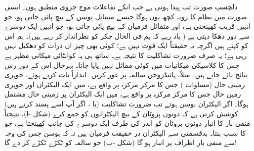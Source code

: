 دلچسپ صورت تب پیدا ہوتی ہے جب انکے تفاعلات موج جزوی منطبق ہوں۔ ایسی صورت میں نظام کا رویہ کچھ یوں ہوگا جیسے متماثل بوسن کے بیچ پائی جاتی ہو، جو انہیں قریب کھینچتی ہے، اور متماثل فرمیان کے بیچ  پائی جاتی ہو، جو انہیں ایک دوسرے سے دور دھکا دیتی ہے ( یاد رہے کہ ہم فی الحال چکر کو نظرانداز کر رہے ہیں)۔ ہم اس کو  کہتے ہیں اگرچہ یہ حقیقتاً ایک قوت نہیں ہے؛ کوئی بھی چیز ان ذرات کو دھکیل نہیں رہی ہے؛ یہ صرف ضرورت تشاکلیت کا  نتیجہ ہے۔ ساتھ ہی یہ کوانٹائی میکانی مظہر ہے جس کا کلاسیکی میکانیات میں کوئی مماثل نہیں پایا جاتا۔ بہرحال اس کے دور رس نتائج پائے جاتے ہیں۔ مثلاً، ہائیڈروجن سالمہ  پر غور کریں۔ اندازاً بات کرتے ہوئے، جوہری زمینی حال (مساوات ) جس کا مرکز مرکزہ  پر واقع ہے، میں ایک الیکٹران اور جوہری زمین حال جس کا مرکز مرکزہ  پر واقع ہے، میں ایک الیکٹران پر زمینی حال مشتمل ہوگا۔ اگر الیکٹران بوسن ہوتے تب ضرورت تشاکلیت (یا ، اگر آپ اسے پسند کرتے ہیں) کوشش کرتی ہے کہ دونوں پروٹان کے بیچ الیکٹرانوں کو جمع کرے
 (شکل -ا)، نتیجتاً منفی بار کا انبار دونوں پروٹان کو اندر کی طرف ایک دوسرے کی جانب کھینچتا ہے، جو  کا سبب بنتا۔ بدقسمتی سے الیکٹران در حقیقت فرمیان ہیں نہ کہ بوسن جس کی وجہ سے منفی بار اطراف پر انبار ہو گا (شکل -ب) جو سالمہ کو ٹکڑے ٹکڑے کر دے گا!

